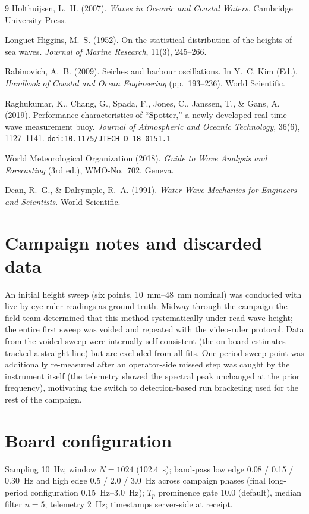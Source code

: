 \documentclass[11pt,a4paper]{article}
\begin{document}
\begin{thebibliography}{9}
Holthuijsen, L.~H. (2007). \emph{Waves in Oceanic and Coastal Waters}.
Cambridge University Press.

Longuet-Higgins, M.~S. (1952). On the statistical distribution of the heights
of sea waves. \emph{Journal of Marine Research}, 11(3), 245--266.

Rabinovich, A.~B. (2009). Seiches and harbour oscillations. In Y.~C. Kim
(Ed.), \emph{Handbook of Coastal and Ocean Engineering} (pp.~193--236).
World Scientific.

Raghukumar, K., Chang, G., Spada, F., Jones, C., Janssen, T., \& Gans, A.
(2019). Performance characteristics of ``Spotter,'' a newly developed
real-time wave measurement buoy. \emph{Journal of Atmospheric and Oceanic
Technology}, 36(6), 1127--1141. \texttt{doi:10.1175/JTECH-D-18-0151.1}

World Meteorological Organization (2018). \emph{Guide to Wave Analysis and
Forecasting} (3rd ed.), WMO-No.~702. Geneva.

Dean, R.~G., \& Dalrymple, R.~A. (1991). \emph{Water Wave Mechanics for
Engineers and Scientists}. World Scientific.
\end{thebibliography}

\appendix
\section{Campaign notes and discarded data}
\label{sec:discarded}
An initial height sweep (six points, \SIrange{10}{48}{\milli\meter} nominal)
was conducted with live by-eye ruler readings as ground truth. Midway through
the campaign the field team determined that this method systematically
under-read wave height; the entire first sweep was voided and repeated with
the video-ruler protocol. Data from the voided sweep were internally
self-consistent (the on-board estimates tracked a straight line) but are
excluded from all fits. One period-sweep point was additionally re-measured
after an operator-side missed step was caught by the instrument itself (the
telemetry showed the spectral peak unchanged at the prior frequency),
motivating the switch to detection-based run bracketing used for the rest of
the campaign.

\section{Board configuration}
Sampling \SI{10}{\hertz}; window $N = 1024$ (\SI{102.4}{\second});
band-pass low edge 0.08 / 0.15 / 0.30~\si{\hertz} and high edge 0.5 / 2.0 /
3.0~\si{\hertz} across campaign phases (final long-period configuration
\SIrange{0.15}{3.0}{\hertz}); $T_p$ prominence gate 10.0 (default), median
filter $n = 5$; telemetry \SI{2}{\hertz}; timestamps server-side at receipt.
\end{document}
